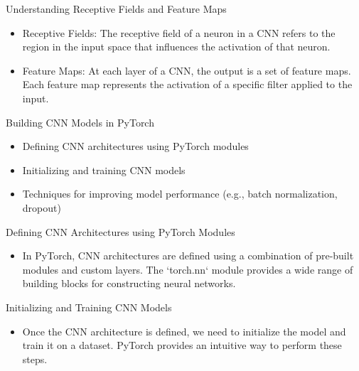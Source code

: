 \documentclass{beamer}
\begin{document}
\begin{frame}{Understanding Receptive Fields and Feature Maps}
\begin{itemize}
    \item Receptive Fields: The receptive field of a neuron in a CNN refers to the region in the input space that influences the activation of that neuron.
    \item Feature Maps: At each layer of a CNN, the output is a set of feature maps. Each feature map represents the activation of a specific filter applied to the input.
\end{itemize}
\end{frame}

\begin{frame}{Building CNN Models in PyTorch}
\begin{itemize}
    \item Defining CNN architectures using PyTorch modules
    \item Initializing and training CNN models
    \item Techniques for improving model performance (e.g., batch normalization, dropout)
\end{itemize}
\end{frame}

\begin{frame}{Defining CNN Architectures using PyTorch Modules}
\begin{itemize}
    \item In PyTorch, CNN architectures are defined using a combination of pre-built modules and custom layers. The `torch.nn` module provides a wide range of building blocks for constructing neural networks.
\end{itemize}
\end{frame}

\begin{frame}{Initializing and Training CNN Models}
\begin{itemize}
    \item Once the CNN architecture is defined, we need to initialize the model and train it on a dataset. PyTorch provides an intuitive way to perform these steps.
\end{itemize}
\end{frame}
\end{document}
